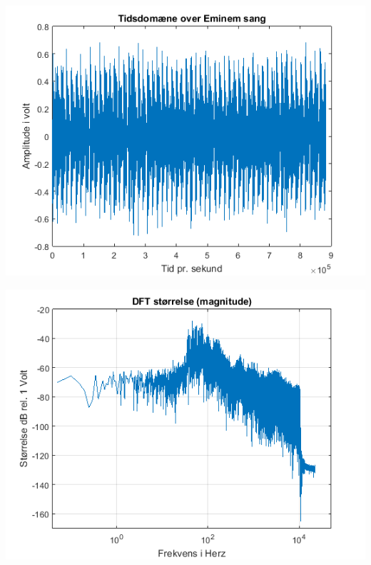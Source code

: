 \documentclass[12pt, letterpaper]{article}
\begin{document}
\begin{center}
\includegraphics[width=\textwidth]{billeder/eminemtid}
\end{center}

\begin{center}
\includegraphics[width=\textwidth]{billeder/eminemstorrelse}
\end{center}
\end{document}
